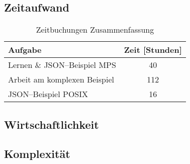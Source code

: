 \lipsum[5]

\subsection{Zeitaufwand}\label{subsec:zeitaufwand}
\begin{table}[ht]
    \centering
    \begin{tabular}{|l|c|}
        \hline
        Aufgabe                                & Zeit [Stunden] \\
        \hline
        \hline
        Lernen \& \ac{JSON}--Beispiel \ac{MPS} & 40             \\
        \hline
        Arbeit am komplexen Beispiel           & 112            \\
        \hline
        \ac{JSON}--Beispiel \ac{POSIX}         & 16             \\
        \hline
    \end{tabular}
    \caption{Zeitbuchungen Zusammenfassung}
    \label{tab:zeitbuchungen-short}
\end{table}
\lipsum[5]

\subsection{Wirtschaftlichkeit}\label{subsec:wirtschaftlichkeit}
\lipsum[5]

\subsection{Komplexität}\label{subsec:komplexitat}
\lipsum[5]
